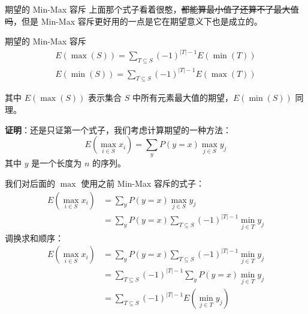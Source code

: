 \documentclass[UTF8]{beamer}
\begin{document}
    
    \begin{frame}{期望的 Min-Max 容斥}
        上面那个式子看着很憨，\sout{都能算最小值了还算不了最大值吗}，但是 Min-Max 容斥更好用的一点是它在期望意义下也是成立的。
        \begin{block}{期望的 Min-Max 容斥}
            \vspace{-2em}
            \begin{gather*}
                E(\max(S)) = \sum_{T\subseteq S}(-1)^{|T|-1} E(\min(T))\\
                E(\min(S)) = \sum_{T\subseteq S}(-1)^{|T|-1}E(\max(T))
            \end{gather*}

            \vspace{-0.5em}
            其中 $E(\max (S))$ 表示集合 $S$ 中所有元素最大值的期望，$E(\min (S))$ 同理。
        \end{block}
        \pause
        \textbf{证明}：还是只证第一个式子，我们考虑计算期望的一种方法：
        $$
        E\left(\max_{i\in S}{x_i}\right)=\sum_{y}{P(y=x)\max_{j\in S}{y_j}}
        $$
        其中 $y$ 是一个长度为 $n$ 的序列。
    \end{frame}    
    \begin{frame}
        我们对后面的 $\max$ 使用之前 Min-Max 容斥的式子：
        $$
        \begin{aligned}E\left(\max_{i\in S}{x_i}\right)&=\sum_{y}{P(y=x)\max_{j\in S}{y_j}}\\
        &=\sum_{y}{P(y=x)\sum_{T\subseteq S}{(-1)^{|T|-1}\min_{j\in T}{y_j}}} \end{aligned}
        $$
        调换求和顺序：
        $$
        \begin{aligned}E\left(\max_{i\in S}{x_i}\right)
        &=\sum_{y}{P(y=x)\sum_{T\subseteq S}{(-1)^{|T|-1}\min_{j\in T}{y_j}}}\\
        &=\sum_{T\subseteq S}{(-1)^{|T|-1}\sum_y{P(y=x)\min_{j\in T}{y_j}}}\\
        &=\sum_{T\subseteq S}{(-1)^{|T|-1}E\left(\min_{j\in T}{y_j}\right)} \end{aligned}
        $$
    \end{frame}
\end{document}
